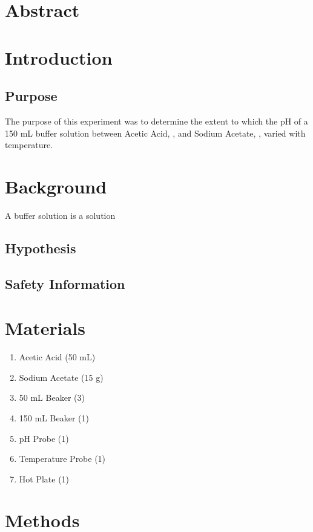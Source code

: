 \documentclass{article}
\begin{document}

\section*{Abstract}

\section*{Introduction} %

\subsection*{Purpose} %
The purpose of this experiment was to determine the extent to which the pH of a 150 mL buffer solution between Acetic Acid, , and Sodium Acetate, , varied with temperature. 

\section*{Background}%

A buffer solution is a solution 

\subsection*{Hypothesis}%

\subsection*{Safety Information}%

\section*{Materials} %
\begin{enumerate}
\item Acetic Acid (50 mL)
\item Sodium Acetate (15 g)
\item 50 mL Beaker (3)
\item 150 mL Beaker (1)
\item pH Probe (1)
\item Temperature Probe (1)
\item Hot Plate (1)
\end{enumerate}
\section*{Methods}%
\end{document}

